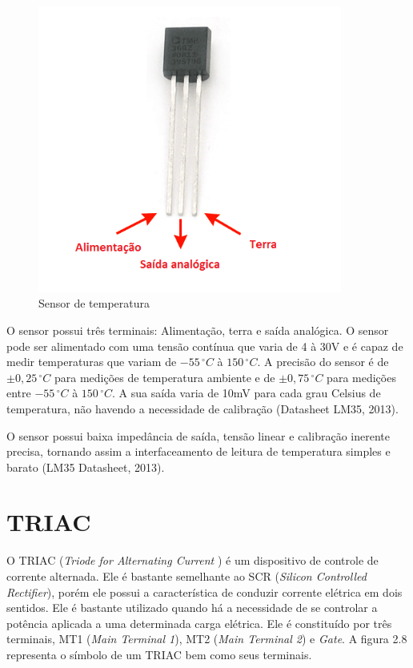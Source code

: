 \begin{figure}[h]

\center

\includegraphics[width=10cm]{imagens/lm35.png}

\label{Sensor de temperatura}

\caption{Sensor de temperatura}

\end{figure}


O sensor possui três terminais: Alimentação, terra e saída analógica. O sensor pode ser alimentado com uma tensão contínua que varia de 4 à 30V e é capaz de medir temperaturas que variam de $-55\,^{\circ}{C}$ à $150\,^{\circ}{C}$. A precisão do sensor é de $ \pm 0,25\,^{\circ}{C}$ para medições de temperatura ambiente e de $ \pm 0,75\,^{\circ}{C}$ para medições entre $-55\,^{\circ}{C}$ à $150\,^{\circ}{C}$. A sua saída varia de 10mV para cada grau Celsius de temperatura, não havendo a necessidade de calibração (Datasheet LM35, 2013).
	
	O sensor possui baixa impedância de saída, tensão linear e calibração inerente precisa, tornando assim a interfaceamento de leitura de temperatura simples e barato (LM35 Datasheet, 2013).


\section{TRIAC}

O TRIAC (\textit{Triode for Alternating Current })  é um dispositivo de controle de corrente alternada. Ele é bastante semelhante ao SCR  (\textit{Silicon Controlled Rectifier}), porém ele possui a característica de conduzir corrente elétrica em dois sentidos. Ele é bastante utilizado quando há a necessidade de se controlar a potência aplicada a uma determinada carga elétrica. Ele é constituído por três terminais, MT1 (\textit{Main Terminal 1}), MT2 (\textit{Main Terminal 2}) e \textit{Gate}. A figura 2.8 representa o símbolo de um TRIAC bem como seus terminais.

